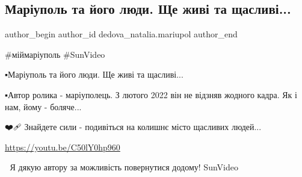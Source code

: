  
 
 
 
 

\subsection{Маріуполь та його люди. Ще живі та щасливі... }
\label{sec:02_02_2023.fb.dedova_natalia.mariupol.1.mar_upol_ta_yogo_lyu}

\ifcmt
 author_begin
   author_id dedova_natalia.mariupol
 author_end
\fi

\#міймаріуполь
\#SunVideo

▪️Маріуполь та його люди. Ще живі та щасливі... 

▪️Автор ролика - маріуполець. З лютого 2022 він не відзняв жодного кадра. Як і
нам, йому - боляче... 

❤️🩹 Знайдете сили - подивіться на колишнє місто щасливих людей... 

\url{https://youtu.be/C50lY0hp960}

💞 Я дякую автору за можливість повернутися додому!  SunVideo
